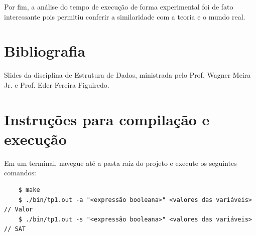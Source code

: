 \documentclass{article}
\begin{document}
Por fim, a análise do tempo de execução de forma experimental foi de fato interessante pois permitiu conferir a similaridade com a teoria e o mundo real.
\section*{Bibliografia}

Slides da disciplina de Estrutura de Dados, ministrada pelo Prof. Wagner Meira Jr. e Prof. Eder Fereira Figuiredo.


\section*{Instruções para compilação e execução}

Em um terminal, navegue até a pasta raiz do projeto e execute os seguintes comandos:

\begin{verbatim}
    $ make
    $ ./bin/tp1.out -a "<expressão booleana>" <valores das variáveis> // Valor 
    $ ./bin/tp1.out -s "<expressão booleana>" <valores das variáveis> // SAT
\end{verbatim}
\end{document}
